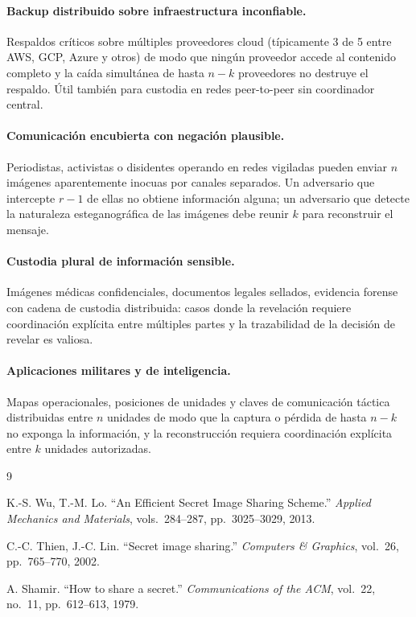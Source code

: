 \documentclass[11pt,a4paper]{article}
\begin{document}
\paragraph{Backup distribuido sobre infraestructura inconfiable.}
Respaldos críticos sobre múltiples proveedores cloud (típicamente 3 de 5
entre AWS, GCP, Azure y otros) de modo que ningún proveedor accede al
contenido completo y la caída simultánea de hasta $n-k$ proveedores no
destruye el respaldo. Útil también para custodia en redes peer-to-peer
sin coordinador central.

\paragraph{Comunicación encubierta con negación plausible.}
Periodistas, activistas o disidentes operando en redes vigiladas pueden
enviar $n$ imágenes aparentemente inocuas por canales separados. Un
adversario que intercepte $r-1$ de ellas no obtiene información alguna;
un adversario que detecte la naturaleza esteganográfica de las imágenes
debe reunir $k$ para reconstruir el mensaje.

\paragraph{Custodia plural de información sensible.} Imágenes médicas
confidenciales, documentos legales sellados, evidencia forense con
cadena de custodia distribuida: casos donde la revelación requiere
coordinación explícita entre múltiples partes y la trazabilidad de la
decisión de revelar es valiosa.

\paragraph{Aplicaciones militares y de inteligencia.} Mapas
operacionales, posiciones de unidades y claves de comunicación táctica
distribuidas entre $n$ unidades de modo que la captura o pérdida de
hasta $n-k$ no exponga la información, y la reconstrucción requiera
coordinación explícita entre $k$ unidades autorizadas.

\begin{thebibliography}{9}

K.-S. Wu, T.-M. Lo.
``An Efficient Secret Image Sharing Scheme.''
\emph{Applied Mechanics and Materials}, vols.~284--287, pp.~3025--3029,
2013.

C.-C. Thien, J.-C. Lin.
``Secret image sharing.''
\emph{Computers \& Graphics}, vol.~26, pp.~765--770, 2002.

A. Shamir.
``How to share a secret.''
\emph{Communications of the ACM}, vol.~22, no.~11, pp.~612--613, 1979.

\end{thebibliography}
\end{document}

